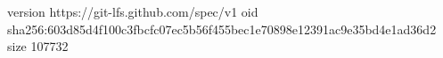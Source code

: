 version https://git-lfs.github.com/spec/v1
oid sha256:603d85d4f100c3fbcfc07ec5b56f455bec1e70898e12391ac9e35bd4e1ad36d2
size 107732
